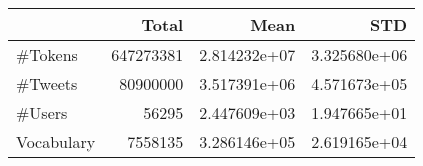 \begin{tabular}{lrrr}
\toprule
{} &      Total &          Mean &           STD \\
\midrule
\#Tokens    &  647273381 &  2.814232e+07 &  3.325680e+06 \\
\#Tweets    &   80900000 &  3.517391e+06 &  4.571673e+05 \\
\#Users     &      56295 &  2.447609e+03 &  1.947665e+01 \\
Vocabulary &    7558135 &  3.286146e+05 &  2.619165e+04 \\
\bottomrule
\end{tabular}
